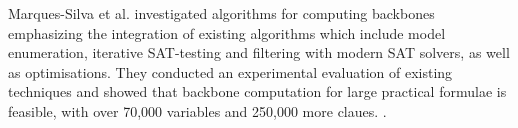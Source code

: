 Marques-Silva et al.  investigated algorithms for computing backbones emphasizing the integration of existing algorithms which include model enumeration, iterative SAT-testing and filtering with modern SAT solvers, as well as optimisations.
They conducted an experimental evaluation of existing techniques and showed that backbone computation for large practical formulae is feasible, with over 70,000 variables and 250,000 more claues. \cite{MJML2010,JLMS12,JLM15}.









